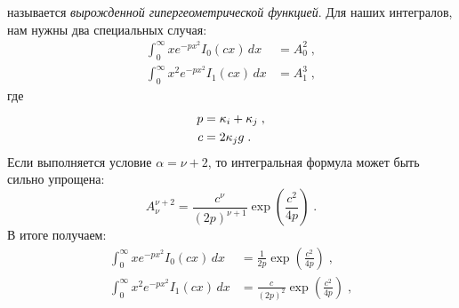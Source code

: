 называется \emph{вырожденной гипергеометрической функцией}. Для наших интегралов, нам нужны два специальных случая:
\begin{equation}
  \begin{split}
    \int_{0}^{\infty}xe^{-px^2}I_0(cx)\,dx &= A^{2}_{0}\;,\\
    \int_{0}^{\infty}x^2e^{-px^2}I_1(cx)\,dx &= A^{3}_{1}\;,
  \end{split}
\end{equation}
где
\begin{equation}
  \begin{split}
    p &= \kappa_i+\kappa_j\;,\\
    c &= 2\kappa_jg\;.
  \end{split}
\end{equation}
Если выполняется условие $\alpha=\nu+2$, то интегральная формула может быть сильно упрощена:
\begin{equation}
  A^{\nu+2}_{\nu} = \frac{c^{\nu}}{(2p)^{\nu+1}}\exp\left(\frac{c^2}{4p}\right)\;.
\end{equation}
В итоге получаем:
\begin{equation}
  \begin{split}
    \int_{0}^{\infty}xe^{-px^2}I_0(cx)\,dx &= \frac{1}{2p}\exp\left(\frac{c^2}{4p}\right)\;,\\
    \int_{0}^{\infty}x^2e^{-px^2}I_1(cx)\,dx &= \frac{c}{(2p)^2}\exp\left(\frac{c^2}{4p}\right)\;,
  \end{split}
\end{equation}